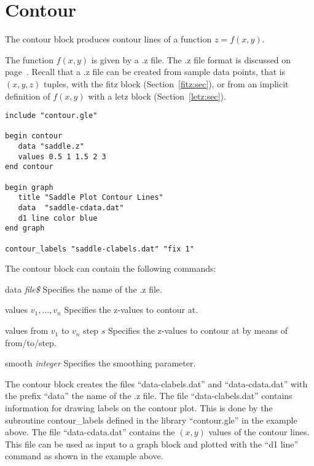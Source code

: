 \section{Contour}

The contour block produces contour lines of a function $z = f(x,y)$.

The function $f(x,y)$ is given by a .z file. The .z file format is discussed on page~\pageref{zfile:pg}. Recall that a .z file can be created from sample data points, that is $(x,y,z)$ tuples, with the {\sf fitz} block (Section~\ref{fitz:sec}), or from an implicit definition of $f(x,y)$ with a {\sf letz} block (Section~\ref{letz:sec}).

\begin{minipage}[c]{8cm}
\begin{Verbatim}
include "contour.gle"

begin contour
   data "saddle.z"
   values 0.5 1 1.5 2 3
end contour

begin graph
   title "Saddle Plot Contour Lines"
   data  "saddle-cdata.dat"
   d1 line color blue
end graph

contour_labels "saddle-clabels.dat" "fix 1"
\end{Verbatim}
\end{minipage}
\hfill
\begin{minipage}[c]{7cm}
\ifdefined\APPLE
\else
\mbox{}
\fi
\end{minipage}

The contour block can contain the following commands:

\begin{commanddescription}
\item[{\sf data {\it file\$}}] Specifies the name of the .z file.

\item[{\sf values $v_1,\ldots, v_n$}] Specifies the z-values to contour at.

\item[{\sf values from $v_1$ to $v_n$ step $s$}] Specifies the z-values to contour at by means of from/to/step.

\item[{\sf smooth {\it integer}}] Specifies the smoothing parameter.
\end{commanddescription}

The contour block creates the files ``data-clabels.dat'' and ``data-cdata.dat'' with the prefix ``data'' the name of the .z file. The file ``data-clabels.dat'' contains information for drawing labels on the contour plot. This is done by the subroutine {\sf contour\_labels} defined in the library ``contour.gle'' in the example above. The file ``data-cdata.dat'' contains the $(x,y)$ values of the contour lines. This file can be used as input to a graph block and plotted with the ``d1 line'' command as shown in the example above.

